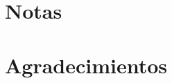 \documentclass[12pt,twoside,openright,a5paper]{book}
\begin{document}


\cleardoublepage

\section*{Notas}



\cleardoublepage

\section*{Agradecimientos}


\end{document}
